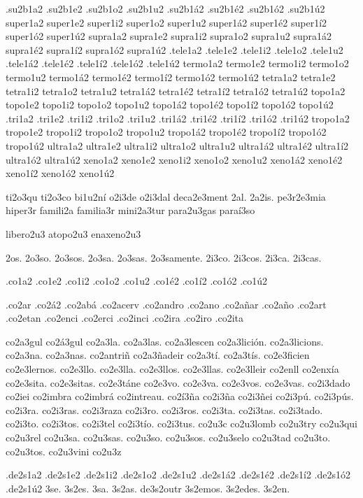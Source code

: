 {.su2b1a2 .su2b1e2          .su2b1o2 .su2b1u2 .su2b1á2 .su2b1é2          .su2b1ó2 .su2b1ú2 
super1a2 super1e2 super1i2 super1o2 super1u2 super1á2 super1é2 super1í2 super1ó2 super1ú2 
supra1a2 supra1e2 supra1i2 supra1o2 supra1u2 supra1á2 supra1é2 supra1í2 supra1ó2 supra1ú2 
.tele1a2 .tele1e2 .tele1i2 .tele1o2 .tele1u2 .tele1á2 .tele1é2 .tele1í2 .tele1ó2 .tele1ú2 
termo1a2 termo1e2 termo1i2 termo1o2 termo1u2 termo1á2 termo1é2 termo1í2 termo1ó2 termo1ú2 
tetra1a2 tetra1e2 tetra1i2 tetra1o2 tetra1u2 tetra1á2 tetra1é2 tetra1í2 tetra1ó2 tetra1ú2 
topo1a2 topo1e2 topo1i2 topo1o2 topo1u2 topo1á2 topo1é2 topo1í2 topo1ó2 topo1ú2 
.tri1a2 .tri1e2 .tri1i2 .tri1o2 .tri1u2 .tri1á2 .tri1é2 .tri1í2 .tri1ó2 .tri1ú2 
tropo1a2 tropo1e2 tropo1i2 tropo1o2 tropo1u2 tropo1á2 tropo1é2 tropo1í2 tropo1ó2 tropo1ú2 
ultra1a2 ultra1e2 ultra1i2 ultra1o2 ultra1u2 ultra1á2 ultra1é2 ultra1í2 ultra1ó2 ultra1ú2 
xeno1a2 xeno1e2 xeno1i2 xeno1o2 xeno1u2 xeno1á2 xeno1é2 xeno1í2 xeno1ó2 xeno1ú2 

ti2o3qu ti2o3co bi1u2ní o2i3de o2i3dal deca2e3ment 2al. 2a2is. pe3r2e3mia hiper3r 
famili2a familia3r mini2a3tur para2u3gas paraí3so 

libero2u3 
atopo2u3 
enaxeno2u3 

2os. 2o3so. 2o3sos. 2o3sa. 2o3sas. 2o3samente. 
2i3co. 2i3cos. 2i3ca. 2i3cas. 

.co1a2 .co1e2 .co1i2 .co1o2 .co1u2        .co1é2 .co1í2 .co1ó2 .co1ú2 

.co2ar 
.co2á2 
.co2abá 
.co2acerv 
.co2andro 
.co2ano 
.co2añar 
.co2año 
.co2art 
.co2etan 
.co2enci 
.co2erci 
.co2inci 
.co2ira 
.co2iro 
.co2ita 

co2a3gul 
co2á3gul 
co2a3la. 
co2a3las. 
co2a3lescen 
co2a3lición. 
co2a3licions. 
co2a3na. 
co2a3nas. 
co2antriñ 
co2a3ñadeir 
co2a3tí. 
co2a3tís. 
co2e3ficien 
co2e3lernos. 
co2e3llo. 
co2e3lla. 
co2e3llos. 
co2e3llas. 
co2e3lleir 
co2enll 
co2enxía 
co2e3sita. 
co2e3sitas. 
co2e3táne 
co2e3vo. 
co2e3va. 
co2e3vos. 
co2e3vas. 
co2i3dado 
co2iei 
co2imbra 
co2imbrá 
co2intreau. 
co2í3ña 
co2i3ña 
co2i3ñei 
co2i3pú. 
co2i3pús. 
co2i3ra. 
co2i3ras. 
co2i3raza 
co2i3ro. 
co2i3ros. 
co2i3ta. 
co2i3tas. 
co2i3tado. 
co2i3to. 
co2i3tos. 
co2i3tel 
co2i3tío. 
co2i3tus. 
co2u3c 
co2u3lomb 
co2u3try 
co2u3qui 
co2u3rel 
co2u3sa. 
co2u3sas. 
co2u3so. 
co2u3sos. 
co2u3selo 
co2u3tad 
co2u3to. 
co2u3tos. 
co2u3vini 
co2u3z 

.de2s1a2 .de2s1e2 .de2s1i2 .de2s1o2 .de2s1u2 .de2s1á2 .de2s1é2 .de2s1í2 .de2s1ó2 .de2s1ú2 
3se. 3s2es. 3sa. 3s2as. de3s2outr 3s2emos. 3s2edes. 3s2en. 

}
